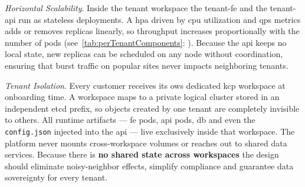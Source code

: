 \documentclass[11pt, a4paper, oneside, listof=totoc]{scrartcl}
\newcommand{\see}[1]{(see~\autoref{#1}: \textit{\nameref{#1}})}
\begin{document}
                \begin{enumerate}[label={[\arabic*]:},
                    ref=Challenge~\arabic*,
                    leftmargin=*,
                    itemsep=0.6\baselineskip]

                    \item\label{chal:architectureScalability}
                        \textit{Horizontal Scalability}.
                        Inside the tenant workspace the tenant-\gls{fe} and the tenant-\gls{api} run
                        as stateless deployments.
                        A \gls{hpa} driven by \gls{cpu} utilization and \gls{qps} metrics adds or
                        removes replicas linearly, so throughput increases proportionally with the
                        number of pods \see{tab:perTenantComponents}.
                        Because the \gls{api} keeps no local state, new replicas can be scheduled on
                        any node without coordination, ensuring that burst traffic on popular sites
                        never impacts neighboring tenants.

                    \item\label{chal:architectureIsolation}
                        \textit{Tenant Isolation}.
                        Every customer receives its ows dedicated \gls{kcp} workspace at onboarding
                        time.
                        A workspace maps to a private logical cluster stored in an independent
                        \gls{etcd} prefix, so objects created by one tenant are completely invisible
                        to others.
                        All runtime artifacts --- \gls{fe} pods, \gls{api} pods, \gls{db} and even
                        the \texttt{config.json} injected into the \gls{api} --- live exclusively
                        inside that workspace.
                        The platform never mounts cross-workspace volumes or reaches out to shared
                        data services.
                        Because there is \textbf{no shared state across workspaces} the design
                        should eliminate noisy-neighbor effects, simplify compliance and guarantee
                        data sovereignty for every tenant.


\end{enumerate}
\end{document}
